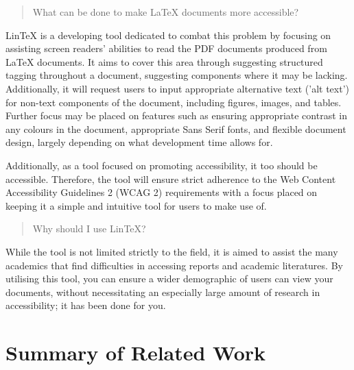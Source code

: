 \documentclass[11pt,titlepage,dvipsnames,table,xcdraw]{article}
\begin{document}
\begin{quote}
What can be done to make LaTeX documents more accessible?
\end{quote}
LinTeX is a developing tool dedicated to combat this problem by focusing on assisting screen readers' abilities to read the PDF documents produced from LaTeX documents. It aims to cover this area through suggesting structured tagging throughout a document, suggesting components where it may be lacking. Additionally, it will request users to input appropriate alternative text ('alt text') for non-text components of the document, including figures, images, and tables. Further focus may be placed on features such as ensuring appropriate contrast in any colours in the document, appropriate Sans Serif fonts, and flexible document design, largely depending on what development time allows for. 

Additionally, as a tool focused on promoting accessibility, it too should be accessible. Therefore, the tool will ensure strict adherence to the Web Content Accessibility Guidelines 2 (WCAG 2) \cite{wcag} requirements with a focus placed on keeping it a simple and intuitive tool for users to make use of.

\begin{quote}
Why should I use LinTeX?
\end{quote}
While the tool is not limited strictly to the field, it is aimed to assist the many academics that find difficulties in accessing reports and academic literatures. By utilising this tool, you can ensure a wider demographic of users can view your documents, without necessitating an especially large amount of research in accessibility; it has been done for you.
\clearpage

\section{Summary of Related Work}


\end{document}

